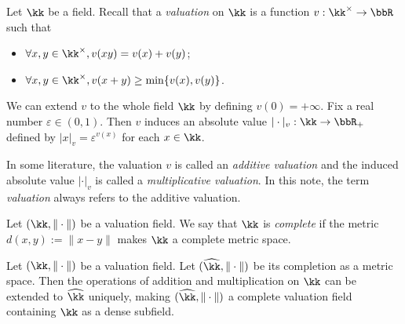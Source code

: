     \begin{remark}\label{rmk:additive_and_multiplicative_valuation_on_a_field}
        Let \(\kk\) be a field.
        Recall that a \emph{valuation} on \(\kk\) is a function \(v: \kk^\times \to \bbR\) such that
        \begin{itemize}
            \item \(\forall x,y \in \kk^\times, v(xy) = v(x) + v(y)\);
            \item \(\forall x,y \in \kk^\times, v(x + y) \geq \min\{v(x), v(y)\}\).
        \end{itemize}
        We can extend \(v\) to the whole field \(\kk\) by defining \(v(0) = +\infty\).
        Fix a real number \(\varepsilon \in (0,1)\).
        Then \(v\) induces an absolute value \(|\cdot|_v: \kk \to \bbR_+\) defined by \(|x|_v = \varepsilon^{v(x)}\) for each \(x \in \kk\).

        In some literature, the valuation \(v\) is called an \emph{additive valuation} and the induced absolute value \(|\cdot|_v\) is called a \emph{multiplicative valuation}.
        In this note, the term \emph{valuation} always refers to the additive valuation.
    \end{remark}

    \begin{definition}\label{def:complete_valuation_field}
        Let \((\kk,\|\cdot\|)\) be a valuation field.
        We say that \(\kk\) is \emph{complete} if the metric \(d(x,y) := \|x - y\|\) makes \(\kk\) a complete metric space.
    \end{definition}

    \begin{lemma}\label{lem:completion_of_valuation_field}
        Let \((\kk,\|\cdot\|)\) be a valuation field.
        Let \((\widehat{\kk},\|\cdot\|)\) be its completion as a metric space.
        Then the operations of addition and multiplication on \(\kk\) can be extended to \(\widehat{\kk}\) uniquely, making \((\widehat{\kk},\|\cdot\|)\) a complete valuation field containing \(\kk\) as a dense subfield.
    \end{lemma}


